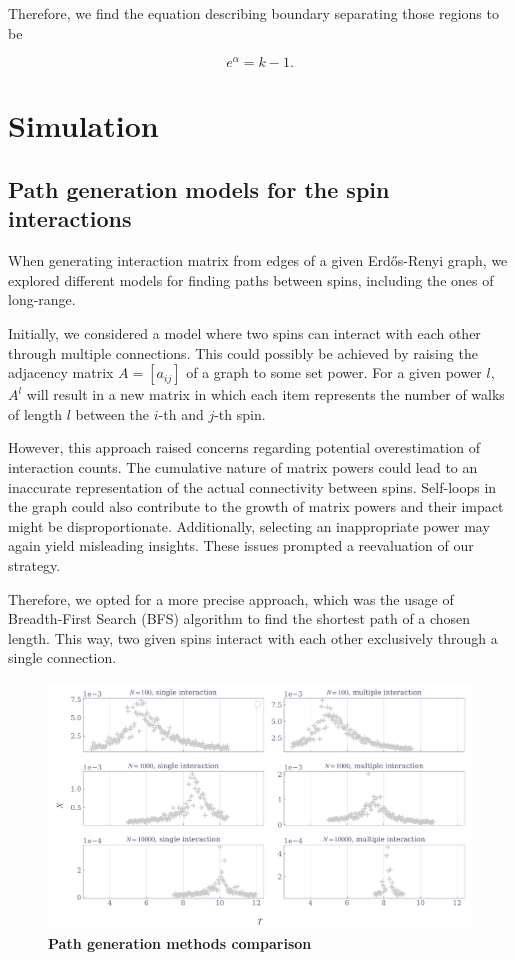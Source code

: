 \documentclass[11pt,a4paper]{article}
\begin{document}
Therefore, we find the equation describing boundary separating those regions to be

\begin{equation}
    e^\alpha = k-1.
\end{equation}

\section{Simulation}

\subsection{Path generation models for the spin interactions}

When generating interaction matrix from edges of a given Erdős-Renyi graph, we explored different models for finding paths between spins, including the ones of long-range.

Initially, we considered a model where two spins can interact with each other through multiple connections. This could possibly be achieved by raising the adjacency matrix $A=[a_{ij}]$ of a graph to some set power. For a given power $l$, $A^l$ will result in a new matrix in which each item represents the number of walks of length $l$ between the $i$-th and $j$-th spin.

However, this approach raised concerns regarding potential overestimation of interaction counts. The cumulative nature of matrix powers could lead to an inaccurate representation of the actual connectivity between spins. Self-loops in the graph could also contribute to the growth of matrix powers and their impact might be disproportionate. Additionally, selecting an inappropriate power may again yield misleading insights. These issues prompted a reevaluation of our strategy.

Therefore, we opted for a more precise approach, which was the usage of Breadth-First Search (BFS) algorithm to find the shortest path of a chosen length. This way, two given spins interact with each other exclusively through a single connection.

\begin{figure}[ht!]
    \centering
    \caption{\textbf{Path generation methods comparison}}
    \includegraphics[width=\linewidth]{../figures/single_vs_multiple.pdf}
\end{figure}
\pagebreak
\end{document}
